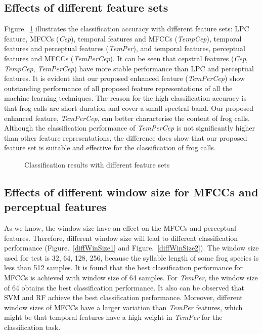 \subsection{Effects of different feature sets}
Figure.~\ref{diffFeature} illustrates the classification accuracy with different feature sets: LPC feature, MFCCs (\textit{Cep}), temporal features and MFCCs (\textit{TempCep}), temporal features and perceptual features (\textit{TemPer}), and temporal features, perceptual features and MFCCs (\textit{TemPerCep}). It can be seen that cepstral features (\textit{Cep}, \textit{TempCep}, \textit{TemPerCep}) have more stable performance than LPC and perceptual features. It is evident that our proposed enhanced feature (\textit{TemPerCep}) show outstanding performance of all proposed feature representations of all the machine learning techniques. The reason for the high classification accuracy is that frog calls are short duration and cover a small spectral band. Our proposed enhanced feature, \textit{TemPerCep}, can better characterise the content of frog calls. Although the classification performance of \textit{TemPerCep} is not significantly higher than other feature representations, the difference does show that our proposed feature set is suitable and effective for the classification of frog calls.   


\begin{figure}[htb!] %
\caption{Classification results with different feature sets}
\label{diffFeature} 
\end{figure}

\subsection{Effects of different window size for MFCCs and perceptual features}
As we know, the window size have an effect on the MFCCs and perceptual features. Therefore, different window size will lead to different classification performance (Figure.~\ref{diffWinSize1} and Figure.~\ref{diffWinSize2}). The window size used for test is 32, 64, 128, 256, because the syllable length of some frog species is less than 512 samples.
It is found that the best classification performance for MFCCs is achieved with window size of 64 samples. For \textit{TemPer}, the window size of 64 obtains the best classification performance. 
It also can be observed that SVM and RF achieve the best classification performance. Moreover, different window sizes of MFCCs have a larger variation than \textit{TemPer} features, which  might be that temporal features have a high weight in \textit{TemPer} for the classification task.

